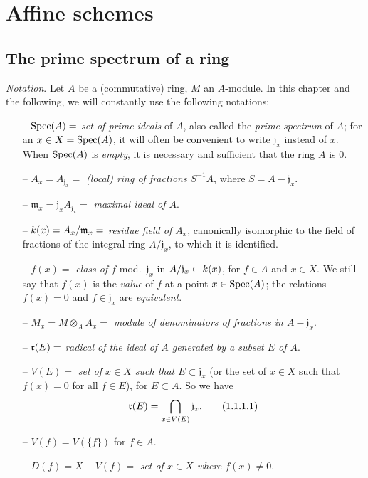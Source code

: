 \setcounter{section}{0}
\section{Affine schemes}
\label{section-affine-schemes}

\setcounter{subsection}{0}
\subsection{The prime spectrum of a ring}
\label{subsection-prime-spec}

\begin{env}[1.1.1]
\label{1.1.1.1}
{\em Notation}. Let $A$ be a (commutative) ring, $M$ an $A$-module. In
this chapter and the following, we will constantly use the following notations:
\begin{itemize}
  \item[--] ${\mathop{\mathrm{Spec}}\nolimits}(A)=$ {\em set of prime ideals} of $A$, also called the
    {\em prime spectrum} of $A$; for an $x\in X={\mathop{\mathrm{Spec}}\nolimits}(A)$, it will often be
    convenient to write $\mathfrak{j}_x$ instead of $x$. When ${\mathop{\mathrm{Spec}}\nolimits}(A)$ is
    {\em empty}, it is necessary and sufficient that the ring $A$ is $0$.
  \item[--] $A_x=A_{\mathfrak{j}_x}=$ {\em (local) ring of fractions $S^{-1}A$},
    where $S=A-\mathfrak{j}_x$.
  \item[--] $\mathfrak{m}_x=\mathfrak{j}_x A_{\mathfrak{j}_x}=$ {\em maximal ideal of $A$}.
  \item[--] $k(x)=A_x/\mathfrak{m}_x=$ {\em residue field of $A_x$}, canonically
    isomorphic to the field of fractions of the integral ring $A/\mathfrak{j}_x$, to which
    it is identified.
  \item[--] $f(x)=$ {\em class of $f$} mod.~$\mathfrak{j}_x$ in
    $A/\mathfrak{j}_x\subset k(x)$, for $f\in A$ and $x\in X$. We still say that $f(x)$
    is the {\em value} of $f$ at a point $x\in{\mathop{\mathrm{Spec}}\nolimits}(A)$; the relations $f(x)=0$ and
    $f\in\mathfrak{j}_x$ are {\em equivalent}.
  \item[--] $M_x=M\otimes_A A_x=$ {\em module of denominators of fractions in
    $A-\mathfrak{j}_x$}.
  \item[--] $\mathfrak{r}(E)=$ {\em radical of the ideal of $A$ generated by a subset $E$ of $A$}.
  \item[--] $V(E)=$ {\em set of $x\in X$ such that $E\subset\mathfrak{j}_x$} (or the set of
    $x\in X$ such that $f(x)=0$ for all $f\in E$), for $E\subset A$. So we have
    \[
      \mathfrak{r}(E)=\bigcap_{x\in V(E)}\mathfrak{j}_x.
      \tag{1.1.1.1}
    \]
  \item[--] $V(f)=V(\{f\})$ for $f\in A$.
  \item[--] $D(f)=X-V(f)=$ {\em set of $x\in X$ where $f(x)\neq 0$}.
\end{itemize}
\end{env}

